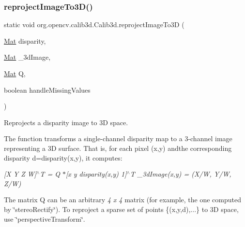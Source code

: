\subsubsection{\texorpdfstring{reproject\+Image\+To3\+D()}{reprojectImageTo3D()}\hspace{0.1cm}{\footnotesize\ttfamily [2/3]}}
{\footnotesize\ttfamily static void org.\+opencv.\+calib3d.\+Calib3d.\+reproject\+Image\+To3D (\begin{DoxyParamCaption}\item[{\mbox{\hyperlink{classorg_1_1opencv_1_1core_1_1_mat}{Mat}}}]{disparity,  }\item[{\mbox{\hyperlink{classorg_1_1opencv_1_1core_1_1_mat}{Mat}}}]{\+\_\+3d\+Image,  }\item[{\mbox{\hyperlink{classorg_1_1opencv_1_1core_1_1_mat}{Mat}}}]{Q,  }\item[{boolean}]{handle\+Missing\+Values }\end{DoxyParamCaption})\hspace{0.3cm}{\ttfamily [static]}}

Reprojects a disparity image to 3D space.

The function transforms a single-\/channel disparity map to a 3-\/channel image representing a 3D surface. That is, for each pixel {\ttfamily (x,y)} andthe corresponding disparity {\ttfamily d=disparity(x,y)}, it computes\+:

{\itshape \mbox{[}X Y Z W\mbox{]}$^\wedge$T = Q $\ast$\mbox{[}x y disparity(x,y) 1\mbox{]}$^\wedge$T \+\_\+3d\+Image(x,y) = (X/W, Y/W, Z/W) }

The matrix {\ttfamily Q} can be an arbitrary {\itshape 4 x 4} matrix (for example, the one computed by \char`\"{}stereo\+Rectify\char`\"{}). To reproject a sparse set of points \{(x,y,d),...\} to 3D space, use \char`\"{}perspective\+Transform\char`\"{}.


